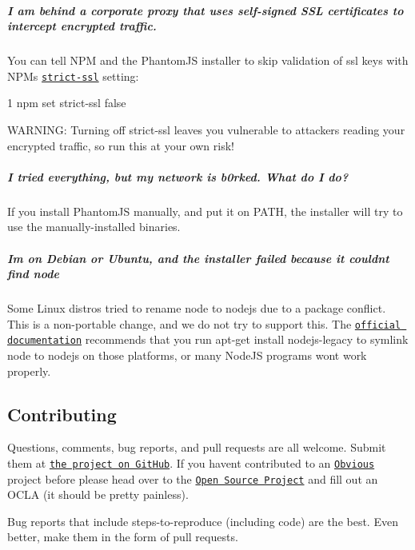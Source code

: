 \subparagraph*{I am behind a corporate proxy that uses self-\/signed S\+S\+L certificates to intercept encrypted traffic.}

You can tell N\+P\+M and the Phantom\+J\+S installer to skip validation of ssl keys with N\+P\+M\textquotesingle{}s \href{https://www.npmjs.org/doc/misc/npm-config.html#strict-ssl}{\tt strict-\/ssl} setting\+:


\begin{DoxyCode}
1 npm set strict-ssl false
\end{DoxyCode}


W\+A\+R\+N\+I\+N\+G\+: Turning off {\ttfamily strict-\/ssl} leaves you vulnerable to attackers reading your encrypted traffic, so run this at your own risk!

\subparagraph*{I tried everything, but my network is b0rked. What do I do?}

If you install Phantom\+J\+S manually, and put it on P\+A\+T\+H, the installer will try to use the manually-\/installed binaries.

\subparagraph*{I\textquotesingle{}m on Debian or Ubuntu, and the installer failed because it couldn\textquotesingle{}t find {\ttfamily node}}

Some Linux distros tried to rename {\ttfamily node} to {\ttfamily nodejs} due to a package conflict. This is a non-\/portable change, and we do not try to support this. The \href{https://github.com/joyent/node/wiki/Installing-Node.js-via-package-manager#ubuntu-mint-elementary-os}{\tt official documentation} recommends that you run {\ttfamily apt-\/get install nodejs-\/legacy} to symlink {\ttfamily node} to {\ttfamily nodejs} on those platforms, or many Node\+J\+S programs won\textquotesingle{}t work properly.

\subsection*{Contributing }

Questions, comments, bug reports, and pull requests are all welcome. Submit them at \href{https://github.com/Obvious/phantomjs/}{\tt the project on Git\+Hub}. If you haven\textquotesingle{}t contributed to an \href{http://github.com/Obvious/}{\tt Obvious} project before please head over to the \href{https://github.com/Obvious/open-source#note-to-external-contributors}{\tt Open Source Project} and fill out an O\+C\+L\+A (it should be pretty painless).

Bug reports that include steps-\/to-\/reproduce (including code) are the best. Even better, make them in the form of pull requests.

